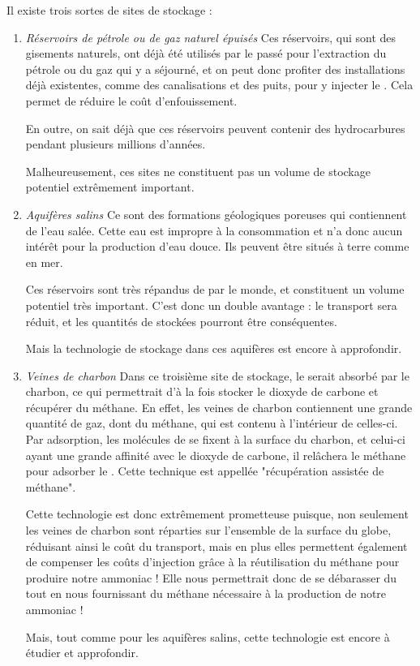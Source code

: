 \documentclass[10pt, a4, oneside, headings=normal]{scrartcl}
\begin{document}
Il existe trois sortes de sites de stockage :
\begin{enumerate}
\item \emph{Réservoirs de pétrole ou de gaz naturel épuisés} Ces réservoirs, qui sont des gisements naturels, ont déjà été utilisés par le passé pour l'extraction du pétrole ou du gaz qui y a séjourné, et on peut donc profiter des installations déjà existentes, comme des canalisations et des puits, pour y injecter le . Cela permet de réduire le coût d'enfouissement.

En outre, on sait déjà que ces réservoirs peuvent contenir des hydrocarbures pendant plusieurs millions d'années.

Malheureusement, ces sites ne constituent pas un volume de stockage potentiel extrêmement important.

\item \emph{Aquifères salins\cite{aquisalin}} Ce sont des formations géologiques poreuses qui contiennent de l'eau salée. Cette eau est impropre à la consommation et n'a donc aucun intérêt pour la production d'eau douce. Ils peuvent être situés à terre comme en mer.

Ces réservoirs sont très répandus de par le monde, et constituent un volume potentiel très important. C'est donc un double avantage : le transport sera réduit, et les quantités de  stockées pourront être conséquentes.

Mais la technologie de stockage dans ces aquifères est encore à approfondir.

\item \emph{Veines de charbon} Dans ce troisième site de stockage, le  serait absorbé par le charbon, ce qui permettrait d'à la fois stocker le dioxyde de carbone et récupérer du méthane. En effet, les veines de charbon contiennent une grande quantité de gaz, dont du méthane, qui est contenu à l'intérieur de celles-ci. Par adsorption, les molécules de  se fixent à la surface du charbon, et celui-ci ayant une grande affinité avec le dioxyde de carbone, il relâchera le méthane pour adsorber le . Cette technique est appellée "récupération assistée de méthane".

Cette technologie est donc extrêmement prometteuse puisque, non seulement les veines de charbon sont réparties sur l'ensemble de la surface du globe, réduisant ainsi le coût du transport, mais en plus elles permettent également de compenser les coûts d'injection grâce à la réutilisation du méthane pour produire notre ammoniac ! Elle nous permettrait donc de se débarasser du  tout en nous fournissant du méthane nécessaire à la production de notre ammoniac !

Mais, tout comme pour les aquifères salins, cette technologie est encore à étudier et approfondir. 
\\
\end{enumerate}
\end{document}
